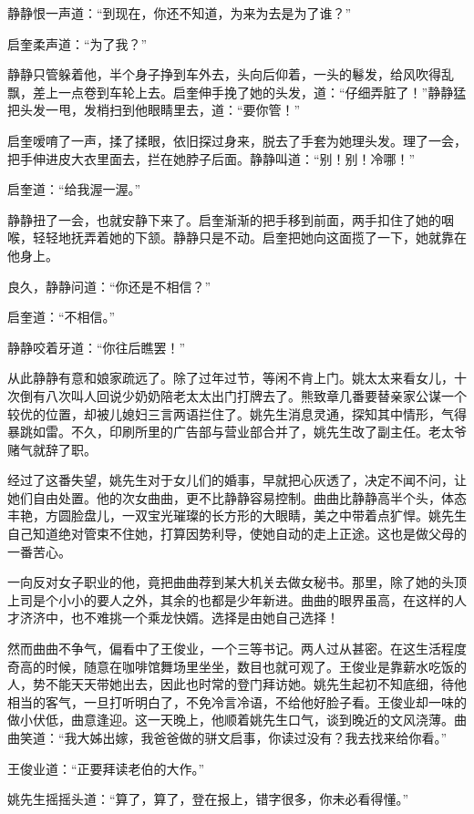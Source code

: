 \par 静静恨一声道：“到现在，你还不知道，为来为去是为了谁？”
\par 启奎柔声道：“为了我？”
\par 静静只管躲着他，半个身子挣到车外去，头向后仰着，一头的鬈发，给风吹得乱飘，差上一点卷到车轮上去。启奎伸手挽了她的头发，道：“仔细弄脏了！”静静猛把头发一甩，发梢扫到他眼睛里去，道：“要你管！”
\par 启奎嗳唷了一声，揉了揉眼，依旧探过身来，脱去了手套为她理头发。理了一会，把手伸进皮大衣里面去，拦在她脖子后面。静静叫道：“别！别！冷哪！”
\par 启奎道：“给我渥一渥。”
\par 静静扭了一会，也就安静下来了。启奎渐渐的把手移到前面，两手扣住了她的咽喉，轻轻地抚弄着她的下颔。静静只是不动。启奎把她向这面揽了一下，她就靠在他身上。
\par 良久，静静问道：“你还是不相信？”
\par 启奎道：“不相信。”
\par 静静咬着牙道：“你往后瞧罢！”
\par 从此静静有意和娘家疏远了。除了过年过节，等闲不肯上门。姚太太来看女儿，十次倒有八次叫人回说少奶奶陪老太太出门打牌去了。熊致章几番要替亲家公谋一个较优的位置，却被儿媳妇三言两语拦住了。姚先生消息灵通，探知其中情形，气得暴跳如雷。不久，印刷所里的广告部与营业部合并了，姚先生改了副主任。老太爷赌气就辞了职。
\par 经过了这番失望，姚先生对于女儿们的婚事，早就把心灰透了，决定不闻不问，让她们自由处置。他的次女曲曲，更不比静静容易控制。曲曲比静静高半个头，体态丰艳，方圆脸盘儿，一双宝光璀璨的长方形的大眼睛，美之中带着点犷悍。姚先生自己知道绝对管束不住她，打算因势利导，使她自动的走上正途。这也是做父母的一番苦心。
\par 一向反对女子职业的他，竟把曲曲荐到某大机关去做女秘书。那里，除了她的头顶上司是个小小的要人之外，其余的也都是少年新进。曲曲的眼界虽高，在这样的人才济济中，也不难挑一个乘龙快婿。选择是由她自己选择！
\par 然而曲曲不争气，偏看中了王俊业，一个三等书记。两人过从甚密。在这生活程度奇高的时候，随意在咖啡馆舞场里坐坐，数目也就可观了。王俊业是靠薪水吃饭的人，势不能天天带她出去，因此也时常的登门拜访她。姚先生起初不知底细，待他相当的客气，一旦打听明白了，不免冷言冷语，不给他好脸子看。王俊业却一味的做小伏低，曲意逢迎。这一天晚上，他顺着姚先生口气，谈到晚近的文风浇薄。曲曲笑道：“我大姊出嫁，我爸爸做的骈文启事，你读过没有？我去找来给你看。”
\par 王俊业道：“正要拜读老伯的大作。”
\par 姚先生摇摇头道：“算了，算了，登在报上，错字很多，你未必看得懂。”
